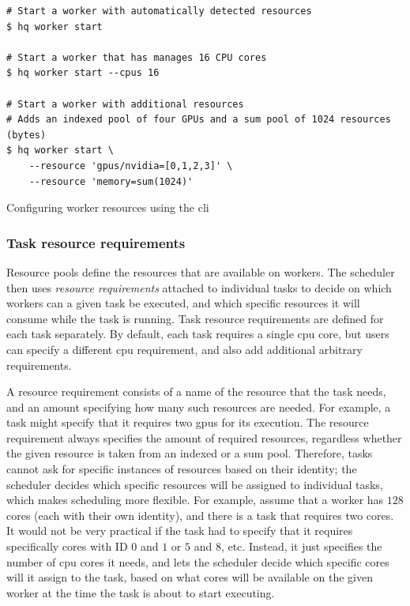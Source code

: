 \begin{listing}[h]
	\begin{verbatim}
# Start a worker with automatically detected resources
$ hq worker start

# Start a worker that has manages 16 CPU cores
$ hq worker start --cpus 16

# Start a worker with additional resources
# Adds an indexed pool of four GPUs and a sum pool of 1024 resources (bytes)
$ hq worker start \
	--resource 'gpus/nvidia=[0,1,2,3]' \
	--resource 'memory=sum(1024)'
	\end{verbatim}
	\caption{Configuring worker resources using the \hyperqueue{} \gls{cli}}
	\label{lst:hq-cli-worker-resources}
\end{listing}

\subsubsection*{Task resource requirements}
Resource pools define the resources that are available on workers. The scheduler then uses
\emph{resource requirements} attached to individual tasks to decide on which workers can a given task be
executed, and which specific resources it will consume while the task is running. Task resource
requirements are defined for each task separately. By default, each task requires a single
\gls{cpu} core, but users can specify a different \gls{cpu}
requirement, and also add additional arbitrary requirements.

A resource requirement consists of a name of the resource that the task needs, and an amount
specifying how many such resources are needed. For example, a task might specify that it requires
two \glspl{gpu} for its execution. The resource requirement always specifies the amount
of required resources, regardless whether the given resource is taken from an indexed or a sum
pool. Therefore, tasks cannot ask for specific instances of resources based on their identity; the
scheduler decides which specific resources will be assigned to individual tasks, which makes
scheduling more flexible. For example, assume that a worker has $128$ cores (each
with their own identity), and there is a task that requires two cores. It would not be very
practical if the task had to specify that it requires specifically cores with ID
$0$ and $1$ or $5$ and
$8$, etc. Instead, it just specifies the number of \gls{cpu} cores
it needs, and lets the scheduler decide which specific cores will it assign to the task, based on
what cores will be available on the given worker at the time the task is about to start executing.

